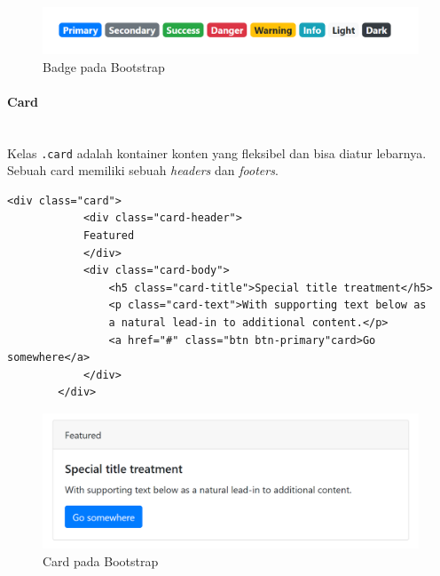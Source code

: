 \documentclass[a4paper,twoside]{article}
\newcommand{\myparagraph}[1]{\paragraph{#1}\mbox{}\\}
\begin{document}
\begin{enumerate}
		\begin{figure} [H]
			\centering  
			\includegraphics[scale=1.0]{badge_bootstrap.PNG}  
			\caption{Badge pada Bootstrap} 
		\end{figure}
		
		\myparagraph{Card}
		Kelas \colorbox{mygray}{\texttt{.card}} adalah kontainer konten yang fleksibel dan bisa diatur lebarnya. Sebuah card memiliki sebuah \textit{headers} dan \textit{footers}.
		
		\begin{lstlisting}[frame=single, basicstyle=\tiny]
		<div class="card">
			<div class="card-header">
			Featured
			</div>
			<div class="card-body">
				<h5 class="card-title">Special title treatment</h5>
				<p class="card-text">With supporting text below as 
				a natural lead-in to additional content.</p>
				<a href="#" class="btn btn-primary"card>Go somewhere</a>
			</div>
		</div>
		\end{lstlisting}
		
		\begin{figure} [H]
			\centering  
			\includegraphics[scale=1.0]{card_bootstrap.PNG}  
			\caption{Card pada Bootstrap} 
		\end{figure}
		

\end{enumerate}
\end{document}
